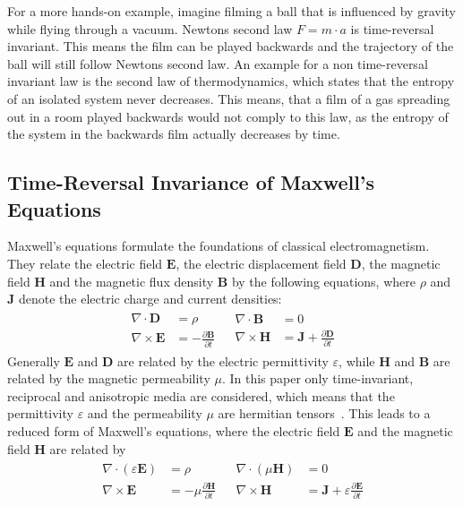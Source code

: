 For a more hands-on example, imagine filming a ball that is influenced by gravity while flying through a vacuum.
Newtons second law \({F}=m \cdot {a}\) is time-reversal invariant. 
This means the film can be played backwards and the trajectory of the ball will still follow Newtons second law.
An example for a non time-reversal invariant law is the second law of thermodynamics, which states that the entropy of an isolated system never decreases.
This means, that a film of a gas spreading out in a room played backwards would not comply to this law, as the entropy of the system in the backwards film actually decreases by time.

\subsection{Time-Reversal Invariance of Maxwell's Equations}
Maxwell's equations formulate the foundations of classical electromagnetism.
They relate the electric field \(\bm{E}\), the electric displacement field \(\bm{D}\), the magnetic field \(\bm{H}\) and the magnetic flux density \(\bm{B}\)  by the following equations, where \(\rho \) and \({\bm{J}}\) denote the electric charge and current densities:
\begin{align}
    \begin{split}
        \nabla \cdot \bm{D} &= \rho \\
        \nabla \times \bm{E} &= -\frac{\partial \bm{B}}{\partial t}
    \end{split}
    &
    \begin{split}
        \nabla \cdot \bm{B} &= 0 \\
        \nabla \times \bm{H} &= \bm{J} + \frac{\partial \bm{D}}{\partial t}
    \end{split}
\end{align}
Generally \(\bm{E}\) and \(\bm{D}\) are related by the electric permittivity \(\varepsilon \), while \(\bm{H}\) and \(\bm{B}\) are related by the magnetic permeability \(\mu \).
In this paper only time-invariant, reciprocal and anisotropic media are considered, which means that the permittivity \(\varepsilon \) and the permeability \(\mu \) are hermitian tensors~\parencite{krowne_electromagnetic_1984}.
This leads to a reduced form of Maxwell's equations, where the electric field \(\bm{E}\) and the magnetic field \(\bm{H}\) are related by
\begin{align}
    \begin{split}
        \nabla \cdot (\varepsilon \bm{E}) &= \rho \\
        \nabla \times \bm{E} &= -\mu \frac{\partial \bm{H}}{\partial t}
    \end{split}
    &
    \begin{split}
        \nabla \cdot (\mu \bm{H}) &= 0 \\
        \nabla \times \bm{H} &= \bm{J} + \varepsilon \frac{\partial \bm{E}}{\partial t}
    \end{split}
\end{align}


